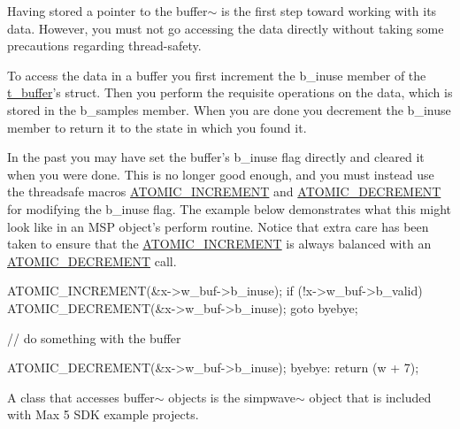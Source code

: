 Having stored a pointer to the buffer$\sim$ is the first step toward working with its data. However, you must not go accessing the data directly without taking some precautions regarding thread-\/safety.

To access the data in a buffer you first increment the b\_\-inuse member of the \hyperlink{structt__buffer}{t\_\-buffer}'s struct. Then you perform the requisite operations on the data, which is stored in the b\_\-samples member. When you are done you decrement the b\_\-inuse member to return it to the state in which you found it.

In the past you may have set the buffer's b\_\-inuse flag directly and cleared it when you were done. This is no longer good enough, and you must instead use the threadsafe macros \hyperlink{group__threading_ga411e2e07982bdfb1803b415a350e311a}{ATOMIC\_\-INCREMENT} and \hyperlink{group__threading_gaa42a5aadef70fe57dc80d247c890c9ac}{ATOMIC\_\-DECREMENT} for modifying the b\_\-inuse flag. The example below demonstrates what this might look like in an MSP object's perform routine. Notice that extra care has been taken to ensure that the \hyperlink{group__threading_ga411e2e07982bdfb1803b415a350e311a}{ATOMIC\_\-INCREMENT} is always balanced with an \hyperlink{group__threading_gaa42a5aadef70fe57dc80d247c890c9ac}{ATOMIC\_\-DECREMENT} call.


\begin{DoxyCode}
    ATOMIC_INCREMENT(&x->w_buf->b_inuse);
    if (!x->w_buf->b_valid) {
        ATOMIC_DECREMENT(&x->w_buf->b_inuse);
        goto byebye;
    }
    
    // do something with the buffer
    
    ATOMIC_DECREMENT(&x->w_buf->b_inuse);
byebye:
    return (w + 7);
\end{DoxyCode}


A class that accesses buffer$\sim$ objects is the simpwave$\sim$ object that is included with Max 5 SDK example projects. 